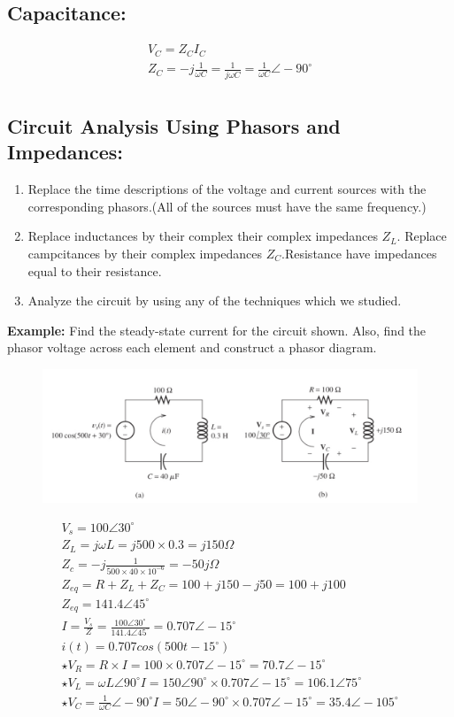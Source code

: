 \documentclass[a4paper,12]{article}
\begin{document}
    \subsection{Capacitance:}
    \begin{gather}
        V_C=Z_CI_C\\
        Z_C=-j \frac{1}{\omega C}=\frac{1}{j\omega C}=\frac{1}{\omega C}\angle-90^\circ\\
    \end{gather}
    \subsection{Circuit Analysis Using Phasors and Impedances:}
    \begin{enumerate}
        \item Replace the time descriptions of the voltage and current sources with the corresponding phasors.(All of the sources must have the same frequency.)
        \item Replace inductances by their complex their complex impedances $Z_L$. Replace campcitances by their complex impedances $Z_C$.Resistance have impedances equal to their resistance.
        \item Analyze the circuit by using any of the techniques which we studied.
    \end{enumerate}
    \textbf{Example: }Find the steady-state current for the circuit shown. Also, find the phasor voltage across each element and construct a phasor diagram.
    \begin{figure}[H]
        \centering
        \includegraphics[width=140mm]{Image/26.jpeg}
    \end{figure}
    \begin{gather}
        V_s=100\angle 30^\circ\\
        Z_L=j\omega L=j500\times 0.3=j150\Omega\\
        Z_c=-j\frac{1}{500\times 40\times 10^{-6}}=-50j\Omega\\
        Z_{eq}=R+Z_L+Z_C=100+j150-j50=100+j100\\
        Z_{eq}=141.4\angle 45^\circ\\
        I=\frac{V_s}{Z}=\frac{100\angle 30^\circ}{141.4\angle 45^\circ}=0.707\angle-15^\circ\\
        i(t)=0.707cos(500t-15^\circ)\\
       \star V_R=R\times I=100\times 0.707\angle-15^\circ=70.7\angle-15^\circ\\
       \star V_L=\omega L\angle90^\circ I=150\angle 90^\circ\times 0.707\angle-15^\circ=106.1\angle75^\circ\\
       \star V_C=\frac{1}{\omega C}\angle-90^\circ I=50\angle-90^\circ\times0.707\angle-15^\circ=35.4\angle-105^\circ
    \end{gather}
\end{document}
